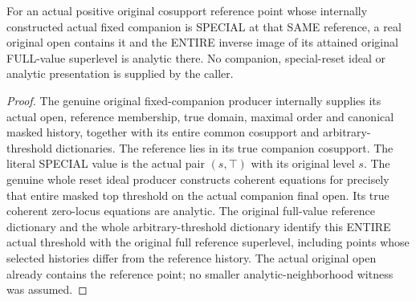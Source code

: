 \begin{theorem}
\label{hir:original-positive-special-full-reference-open-analytic}
\leanok
{}
For an actual positive original cosupport reference point whose internally
constructed actual fixed companion is SPECIAL at that SAME reference, a real
original open contains it and the ENTIRE inverse image of its attained
original FULL-value superlevel is analytic there. No companion, special-reset
ideal or analytic presentation is supplied by the caller.
\end{theorem}
\begin{proof}
The genuine original fixed-companion producer internally supplies its actual
open, reference membership, true domain, maximal order and canonical masked
history, together with its entire common cosupport and arbitrary-threshold
dictionaries. The reference lies in its true companion cosupport. The literal
SPECIAL value is the actual pair $(s,\top)$ with its original level $s$.
The genuine whole reset ideal producer constructs coherent equations for
precisely that entire masked top threshold on the actual companion final open.
Its true coherent zero-locus equations are analytic. The original full-value
reference dictionary and the whole arbitrary-threshold dictionary identify
this ENTIRE actual threshold with the original full reference superlevel,
including points whose selected histories differ from the reference history.
The actual original open already contains the reference point; no smaller
analytic-neighborhood witness was assumed.
\end{proof}

